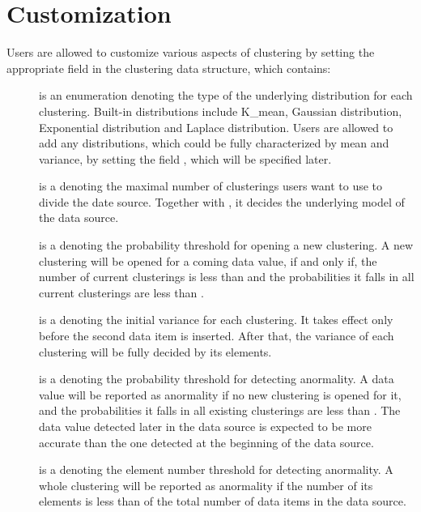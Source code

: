 \section{Customization}
\label{sec:clusterings-customization}
Users are allowed to customize various aspects of clustering by 
setting the appropriate field in the clustering data structure, 
which contains: 

\begin{description}
\item[] is an enumeration denoting the type of the
  underlying distribution for each clustering. Built-in distributions
  include K\_mean, Gaussian distribution, Exponential distribution and
  Laplace distribution. Users are allowed to add any distributions,
  which could be fully characterized by mean and variance, by setting
  the field , which will be specified later.

\item[] is a  denoting the maximal number of
  clusterings users want to use to divide the date source. Together
  with , it decides the underlying model of the data
  source. 

\item[] is a  denoting the probability
  threshold for opening a new clustering. A new clustering will be
  opened for a coming data value, if and only if, the number of current
  clusterings is less than  and the probabilities it falls
  in all current clusterings are less than .

\item[] is a  denoting the initial
  variance for each clustering. It takes effect only before the second
  data item is inserted. After that, the variance of each clustering
  will be fully decided by its elements.

\item[] is a  denoting the
  probability threshold for detecting anormality. A data value will
  be reported as anormality if no new clustering is opened for it, and the
  probabilities it falls in all existing clusterings are less than
  . The data value detected later in the data source
  is expected to be more accurate than the one detected at the
  beginning of the data source.

\item[] is a  denoting the element
  number threshold for detecting anormality. A whole clustering will be
  reported as anormality if the number of its elements is less than
   of the total number of data items in the data source.


\end{description}
